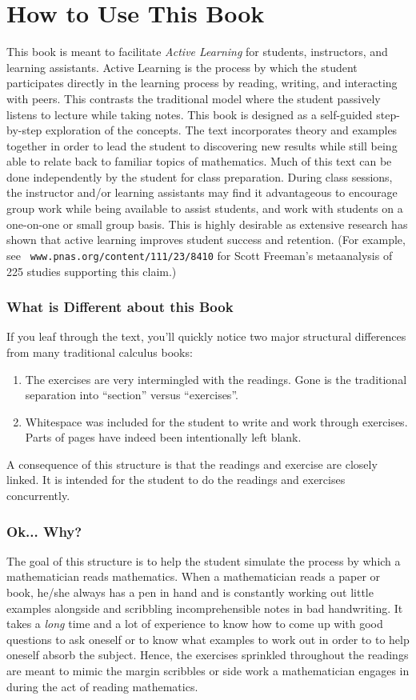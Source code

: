 \section*{How to Use This Book} This book is meant to facilitate \emph{Active Learning} for students, instructors, and learning assistants.  Active Learning is the process by which the student participates directly in the learning process by reading, writing, and interacting with peers.  This contrasts the traditional model where the student passively listens to lecture while taking notes. This book is designed as a self-guided step-by-step exploration of the concepts.  The text incorporates theory and examples together in order to lead the student to discovering new results while still being able to relate back to familiar topics of mathematics.  Much of this text can be done independently by the student for class preparation.  During class sessions, the instructor and/or learning assistants may find it advantageous to encourage group work while being available to assist students, and work with students on a one-on-one or small group basis.  This is highly desirable as extensive research has shown that active learning improves student success and retention. (For example, see \verb! www.pnas.org/content/111/23/8410! for Scott Freeman's metaanalysis of 225 studies supporting this claim.)
%
\subsubsection*{What is Different about this Book} If you leaf through the text, you'll quickly notice two major structural differences from many traditional calculus books:
%
\begin{enumerate}
\item The exercises are very intermingled with the readings.  Gone is the traditional separation into ``section'' versus ``exercises''.  
\item Whitespace was included for the student to write and work through exercises.  Parts of pages have indeed been intentionally left blank.
\end{enumerate}
%
A consequence of this structure is that the readings and exercise are closely linked.  It is intended for the student to do the readings and exercises concurrently.
\subsubsection*{Ok... Why?}
The goal of this structure is to help the student simulate the process by which a mathematician reads mathematics.   When a mathematician reads a paper or book, he/she always has a pen in hand and is constantly working out little examples alongside and scribbling incomprehensible notes in bad handwriting. 
%
It takes a \emph{long} time and a lot of experience to know how to come up with good questions to ask oneself or to know what examples to work out in order to to help oneself absorb the subject.  Hence, the exercises sprinkled throughout the readings are meant to mimic the margin scribbles or side work a mathematician engages in during the act of reading mathematics.
%
